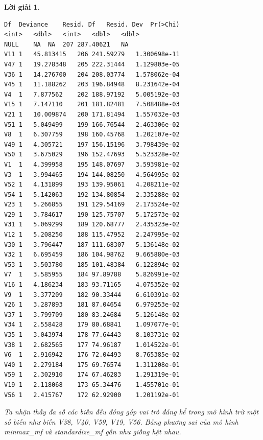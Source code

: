 \documentclass[14pt, a4paper]{article}
\theoremstyle{sltheorem}
\theoremstyle{soltheorem}
\newtheorem*{loigiai}{Lời giải}
\begin{document}
\begin{loigiai}
    \begin{verbatim}
Df	Deviance	Resid. Df	Resid. Dev	Pr(>Chi)
<int>	<dbl>	<int>	<dbl>	<dbl>
NULL	NA	NA	207	287.40621	NA
V11	1	45.813415	206	241.59279	1.300698e-11
V47	1	19.278348	205	222.31444	1.129803e-05
V36	1	14.276700	204	208.03774	1.578062e-04
V45	1	11.188262	203	196.84948	8.231642e-04
V4	1	7.877562	202	188.97192	5.005192e-03
V15	1	7.147110	201	181.82481	7.508488e-03
V21	1	10.009874	200	171.81494	1.557032e-03
V51	1	5.049499	199	166.76544	2.463306e-02
V8	1	6.307759	198	160.45768	1.202107e-02
V49	1	4.305721	197	156.15196	3.798439e-02
V50	1	3.675029	196	152.47693	5.523328e-02
V1	1	4.399958	195	148.07697	3.593981e-02
V3	1	3.994465	194	144.08250	4.564995e-02
V52	1	4.131899	193	139.95061	4.208211e-02
V54	1	5.142063	192	134.80854	2.335288e-02
V23	1	5.266855	191	129.54169	2.173524e-02
V29	1	3.784617	190	125.75707	5.172573e-02
V31	1	5.069299	189	120.68777	2.435323e-02
V12	1	5.208250	188	115.47952	2.247995e-02
V30	1	3.796447	187	111.68307	5.136148e-02
V32	1	6.695459	186	104.98762	9.665880e-03
V53	1	3.503780	185	101.48384	6.122894e-02
V7	1	3.585955	184	97.89788	5.826991e-02
V16	1	4.186234	183	93.71165	4.075352e-02
V9	1	3.377209	182	90.33444	6.610391e-02
V26	1	3.287893	181	87.04654	6.979253e-02
V37	1	3.799709	180	83.24684	5.126148e-02
V34	1	2.558428	179	80.68841	1.097077e-01
V35	1	3.043974	178	77.64443	8.103731e-02
V38	1	2.682565	177	74.96187	1.014522e-01
V6	1	2.916942	176	72.04493	8.765385e-02
V40	1	2.279184	175	69.76574	1.311208e-01
V59	1	2.302910	174	67.46283	1.291319e-01
V19	1	2.118068	173	65.34476	1.455701e-01
V56	1	2.415767	172	62.92900	1.201192e-01
    \end{verbatim}

    Ta nhận thấy đa số các biến đều đóng góp vai trò đáng kể trong mô hình trừ một số biến như biến V38, V40, V59, V19, V56.
    Bảng phương sai của mô hình minmax\_mf và standardize\_mf gần như giống hệt nhau.


\end{loigiai}
\end{document}
